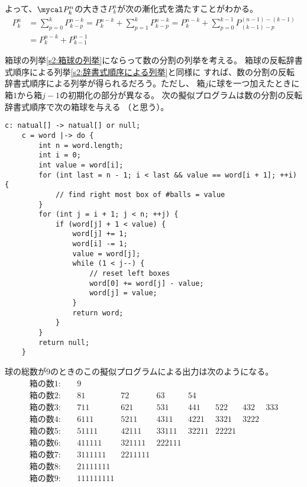 	よって、$\bunkatu_k^n$の大きさ$P_k^n$が次の漸化式を満たすことがわかる。
	\begin{equation*}\begin{split} %
		P_k^n &= \sum_{p=0}^kP_{k-p}^{n-k}
			= P_k^{n-k} + \sum_{p=1}^kP_{k-p}^{n-k}
			= P_k^{n-k} + \sum_{p=0}^{k-1}P_{(k-1)-p}^{(n-1)-(k-1)} \\
			&= P_k^{n-k} + P_{k-1}^{n-1}
	\end{split}\end{equation*} %

	箱球の列挙\ref{s2:箱球の列挙}にならって数の分割の列挙を考える。
	箱球の反転辞書式順序による列挙\ref{s2:辞書式順序による列挙}と同様に
	すれば、数の分割の反転辞書式順序による列挙が得られるだろう。ただし、
	箱$j$に球を一つ加えたときに箱$1$から箱$j-1$の初期化の部分が異なる。
	次の擬似プログラムは数の分割の反転辞書式順序で次の箱球を与える
	（と思う）。
	\begin{lstlisting}[caption=数の分割の反転辞書式順序
	, label=code:数の分割の反転辞書式順序]
	c: natual[] -> natual[] or null;
	c = word |-> do {
		int n = word.length;
		int i = 0;
		int value = word[i];
		for (int last = n - 1; i < last && value == word[i + 1]; ++i) {
			// find right most box of #balls = value
		}
		for (int j = i + 1; j < n; ++j) {
			if (word[j] + 1 < value) {
				word[j] += 1;
				word[i] -= 1;
				value = word[j];
				while (1 < j--) {
					// reset left boxes
					word[0] += word[j] - value;
					word[j] = value;
				}
				return word;
			}
		}
		return null;
	}
	\end{lstlisting}
	球の総数が$9$のときのこの擬似プログラムによる出力は次のようになる。
	\begin{equation}\label{eq:6の分割の反転辞書式順序}
	\begin{array}{llllllll} %
		\text{箱の数}1:\quad & 9 \\
		\text{箱の数}2:\quad & 81 & 72 & 63 & 54 \\
		\text{箱の数}3:\quad & 711 & 621 & 531 & 441 & 522 & 432 & 333 \\
		\text{箱の数}4:\quad & 6111 & 5211 & 4311 & 4221 & 3321 & 3222 \\
		\text{箱の数}5:\quad & 51111 & 42111 & 33111 & 32211 & 22221 \\
		\text{箱の数}6:\quad & 411111 & 321111 & 222111 \\
		\text{箱の数}7:\quad & 3111111 & 2211111 \\
		\text{箱の数}8:\quad & 21111111 \\
		\text{箱の数}9:\quad & 111111111 \\
	\end{array}\end{equation} %

